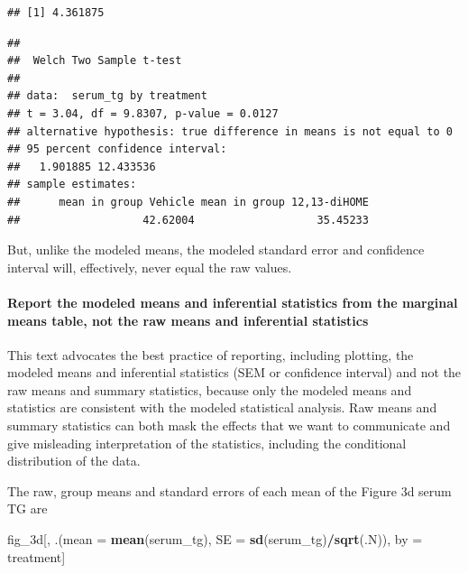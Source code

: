 \documentclass[]{book}
\newenvironment{Shaded}{\begin{snugshade}}{\end{snugshade}}
\newcommand{\DataTypeTok}[1]{\textcolor[rgb]{0.13,0.29,0.53}{#1}}
\newcommand{\KeywordTok}[1]{\textcolor[rgb]{0.13,0.29,0.53}{\textbf{#1}}}
\newcommand{\NormalTok}[1]{#1}
\newcommand{\OperatorTok}[1]{\textcolor[rgb]{0.81,0.36,0.00}{\textbf{#1}}}
\newcommand{\StringTok}[1]{\textcolor[rgb]{0.31,0.60,0.02}{#1}}
\let\oldparagraph\paragraph
\renewcommand{\paragraph}[1]{\oldparagraph{#1}\mbox{}}
\begin{document}
\begin{verbatim}
## [1] 4.361875
\end{verbatim}

\begin{verbatim}
## 
##  Welch Two Sample t-test
## 
## data:  serum_tg by treatment
## t = 3.04, df = 9.8307, p-value = 0.0127
## alternative hypothesis: true difference in means is not equal to 0
## 95 percent confidence interval:
##   1.901885 12.433536
## sample estimates:
##      mean in group Vehicle mean in group 12,13-diHOME 
##                   42.62004                   35.45233
\end{verbatim}

But, unlike the modeled means, the modeled standard error and confidence interval will, effectively, never equal the raw values.

\hypertarget{report-the-modeled-means-and-inferential-statistics-from-the-marginal-means-table-not-the-raw-means-and-inferential-statistics}{%
\paragraph{Report the modeled means and inferential statistics from the marginal means table, not the raw means and inferential statistics}\label{report-the-modeled-means-and-inferential-statistics-from-the-marginal-means-table-not-the-raw-means-and-inferential-statistics}}

This text advocates the best practice of reporting, including plotting, the modeled means and inferential statistics (SEM or confidence interval) and not the raw means and summary statistics, because only the modeled means and statistics are consistent with the modeled statistical analysis. Raw means and summary statistics can both mask the effects that we want to communicate and give misleading interpretation of the statistics, including the conditional distribution of the data.

The raw, group means and standard errors of each mean of the Figure 3d serum TG are

\begin{Shaded}
\begin{Highlighting}[]
\NormalTok{fig_3d[, .(}\DataTypeTok{mean =} \KeywordTok{mean}\NormalTok{(serum_tg),}
           \DataTypeTok{SE =} \KeywordTok{sd}\NormalTok{(serum_tg)}\OperatorTok{/}\KeywordTok{sqrt}\NormalTok{(.N)),}
\NormalTok{       by =}\StringTok{ }\NormalTok{treatment]}
\end{Highlighting}
\end{Shaded}
\end{document}
